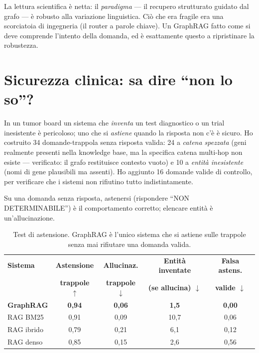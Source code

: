 \documentclass[11pt,a4paper]{report}
\begin{document}
La lettura scientifica è netta: il \emph{paradigma} --- il recupero
strutturato guidato dal grafo --- è robusto alla variazione linguistica.
Ciò che era fragile era una scorciatoia di ingegneria (il router a parole
chiave). Un GraphRAG fatto come si deve comprende l'intento della domanda,
ed è esattamente questo a ripristinare la robustezza.

\section{Sicurezza clinica: sa dire ``non lo so''?}

In un tumor board un sistema che \emph{inventa} un test diagnostico o un
trial inesistente è pericoloso; uno che si \emph{astiene} quando la risposta
non c'è è sicuro. Ho costruito 34 domande-trappola senza risposta valida:
24 a \emph{catena spezzata} (geni realmente presenti nella knowledge base,
ma la specifica catena multi-hop non esiste --- verificato: il grafo
restituisce contesto vuoto) e 10 a \emph{entità inesistente} (nomi di gene
plausibili ma assenti). Ho aggiunto 16 domande valide di controllo, per
verificare che i sistemi non rifiutino tutto indistintamente.

Su una domanda senza risposta, astenersi (rispondere ``NON DETERMINABILE'')
è il comportamento corretto; elencare entità è un'allucinazione.

\begin{table}[H]
\centering
\caption{Test di astensione. GraphRAG è l'unico sistema che si astiene sulle
trappole senza mai rifiutare una domanda valida.}
\label{tab:astensione}
\begin{tabular}{lcccc}
\toprule
\textbf{Sistema} & \textbf{Astensione} & \textbf{Allucinaz.} & \textbf{Entità inventate} & \textbf{Falsa astens.} \\
                 & \textbf{trappole $\uparrow$} & \textbf{trappole $\downarrow$} & \textbf{(se allucina) $\downarrow$} & \textbf{valide $\downarrow$} \\
\midrule
\textbf{GraphRAG} & \textbf{0,94} & \textbf{0,06} & \textbf{1,5}  & \textbf{0,00} \\
RAG BM25          & 0,91 & 0,09 & 10,7 & 0,06 \\
RAG ibrido        & 0,79 & 0,21 & 6,1  & 0,12 \\
RAG denso         & 0,85 & 0,15 & 2,6  & 0,56 \\
\bottomrule
\end{tabular}
\end{table}
\end{document}
